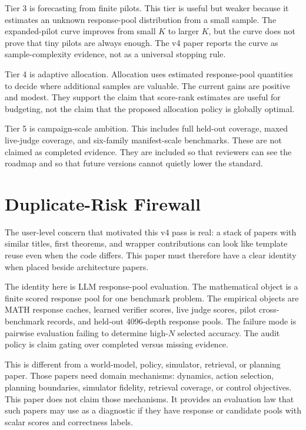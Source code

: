 Tier 3 is forecasting from finite pilots. This tier is useful but weaker
because it estimates an unknown response-pool distribution from a small sample.
The expanded-pilot curve improves from small $K$ to larger $K$, but the curve
does not prove that tiny pilots are always enough. The v4 paper reports the
curve as sample-complexity evidence, not as a universal stopping rule.

Tier 4 is adaptive allocation. Allocation uses estimated response-pool
quantities to decide where additional samples are valuable. The current gains
are positive and modest. They support the claim that score-rank estimates are
useful for budgeting, not the claim that the proposed allocation policy is
globally optimal.

Tier 5 is campaign-scale ambition. This includes full held-out coverage,
maxed live-judge coverage, and six-family manifest-scale benchmarks. These are
not claimed as completed evidence. They are included so that reviewers can see
the roadmap and so that future versions cannot quietly lower the standard.

\section{Duplicate-Risk Firewall}
\label{app:duplicate-firewall}

The user-level concern that motivated this v4 pass is real: a stack of papers
with similar titles, first theorems, and wrapper contributions can look like
template reuse even when the code differs. This paper must therefore have a
clear identity when placed beside architecture papers.

The identity here is LLM response-pool evaluation. The mathematical object is
a finite scored response pool for one benchmark problem. The empirical objects
are MATH response caches, learned verifier scores, live judge scores, pilot
cross-benchmark records, and held-out 4096-depth response pools. The failure
mode is pairwise evaluation failing to determine high-$N$ selected accuracy.
The audit policy is claim gating over completed versus missing evidence.

This is different from a world-model, policy, simulator, retrieval, or
planning paper. Those papers need domain mechanisms: dynamics, action
selection, planning boundaries, simulator fidelity, retrieval coverage, or
control objectives. This paper does not claim those mechanisms. It provides an
evaluation law that such papers may use as a diagnostic if they have response
or candidate pools with scalar scores and correctness labels.

